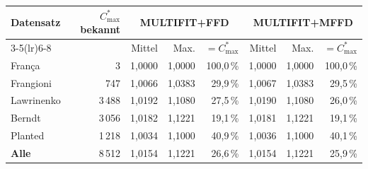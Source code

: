 \begin{tabular}{l r r r r r r r}
\toprule
Datensatz & $C^{*}_{\max}$ bekannt & \multicolumn{3}{c}{MULTIFIT+FFD} & \multicolumn{3}{c}{MULTIFIT+MFFD} \\
\cmidrule(lr){3-5}\cmidrule(lr){6-8}
 & & Mittel & Max. & $=C^{*}_{\max}$ & Mittel & Max. & $=C^{*}_{\max}$ \\
\midrule
França & 3 & 1{,}0000 & 1{,}0000 & 100{,}0\,\% & 1{,}0000 & 1{,}0000 & 100{,}0\,\% \\
Frangioni & 747 & 1{,}0066 & 1{,}0383 & 29{,}9\,\% & 1{,}0067 & 1{,}0383 & 29{,}5\,\% \\
Lawrinenko & 3\,488 & 1{,}0192 & 1{,}1080 & 27{,}5\,\% & 1{,}0190 & 1{,}1080 & 26{,}0\,\% \\
Berndt & 3\,056 & 1{,}0182 & 1{,}1221 & 19{,}1\,\% & 1{,}0181 & 1{,}1221 & 19{,}1\,\% \\
Planted & 1\,218 & 1{,}0034 & 1{,}1000 & 40{,}9\,\% & 1{,}0036 & 1{,}1000 & 40{,}1\,\% \\
\midrule
\textbf{Alle} & 8\,512 & 1{,}0154 & 1{,}1221 & 26{,}6\,\% & 1{,}0154 & 1{,}1221 & 25{,}9\,\% \\
\bottomrule
\end{tabular}

